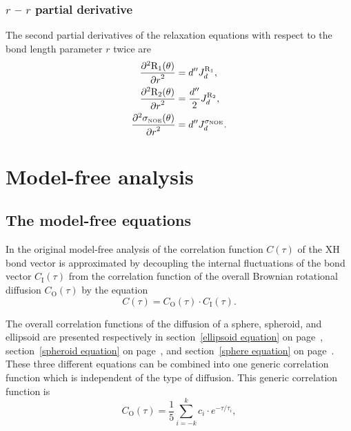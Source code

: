 \subsubsection{$r$ -- $r$ partial derivative}

The second partial derivatives of the relaxation equations with respect to the bond length parameter $r$ twice are
\begin{subequations}
\begin{align}
    \frac{\partial^2 \mathrm{R}_1(\theta)}{{\partial r}^2} &= d'' J_d^{\mathrm{R}_1},                 \label{eq: Ri': d2R1/dr2} \\
    \frac{\partial^2 \mathrm{R}_2(\theta)}{{\partial r}^2} &= \frac{d''}{2} J_d^{\mathrm{R}_2},       \label{eq: Ri': d2R2/dr2} \\
    \frac{\partial^2 \sigma_{\scriptscriptstyle \mathrm{NOE}}(\theta)}{{\partial r}^2} &= d'' J_d^{\sigma_{\scriptscriptstyle \mathrm{NOE}}}.   \label{eq: Ri': d2sigmaNOE/dr2}
\end{align}
\end{subequations}





\newpage
\section{Model-free analysis}




\subsection{The model-free equations}

In the original model-free analysis of \cite{LipariSzabo82a} the correlation function $C(\tau)$ of the XH bond vector is approximated by decoupling the internal fluctuations of the bond vector $C_\mathrm{I}(\tau)$ from the correlation function of the overall Brownian rotational diffusion $C_\mathrm{O}(\tau)$ by the equation
\begin{equation}
    C(\tau) = C_\mathrm{O}(\tau) \cdot C_\mathrm{I}(\tau).
\end{equation}

\noindent The overall correlation functions of the diffusion of a sphere, spheroid, and ellipsoid are presented respectively in section~\ref{ellipsoid equation} on page~\pageref{ellipsoid equation}, section~\ref{spheroid equation} on page~\pageref{spheroid equation}, and section~\ref{sphere equation} on page~\pageref{sphere equation}.  These three different equations can be combined into one generic correlation function which is independent of the type of diffusion.  This generic correlation function is
\begin{equation}
    C_\mathrm{O}(\tau) = \frac{1}{5} \sum_{i=-k}^k c_i \cdot e^{-\tau/\tau_i},
\end{equation}

